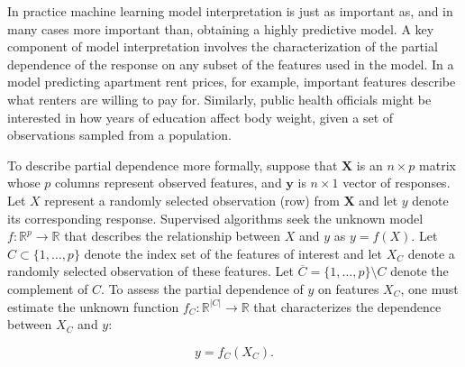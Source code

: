\documentclass[12pt]{article}
\begin{document}
In practice machine learning model interpretation is just as important as, and in many cases more important than, obtaining a highly predictive model. A key component of model interpretation involves the characterization of the partial dependence of the response on any subset of the features used in the model. In a model predicting apartment rent prices, for example, important features describe what renters are willing to pay for. Similarly, public health officials might be interested in how years of education affect body weight, given a set of observations sampled from a population.

To describe partial dependence more formally, suppose that $\mathbf{X}$ is an $n \times p$ matrix whose $p$ columns represent observed features, and $\mathbf{y}$ is $n \times 1$ vector of responses. Let $X$ represent a randomly selected observation (row) from $\mathbf{X}$ and let $y$ denote its corresponding response. Supervised algorithms seek the unknown model $f:\mathbb{R}^{p} \rightarrow \mathbb{R}$ that describes the relationship between $X$ and $y$ as ${y} = f({X}).$ Let $C \subset \{1, \ldots, p\}$ denote the index set of the features of interest and let $X_C$ denote a randomly selected observation of these features. Let $\overline{C} = \{1, \ldots, p\} \setminus C$ denote the complement of $C$. To assess the partial dependence of $y$ on features $X_C$, one must estimate the unknown function $f_C: \mathbb{R}^{|C|} \rightarrow \mathbb{R}$ that characterizes the dependence between $X_C$ and $y$:

\begin{equation}\label{problem}
	y = f_C(X_C).
\end{equation}
\end{document}
